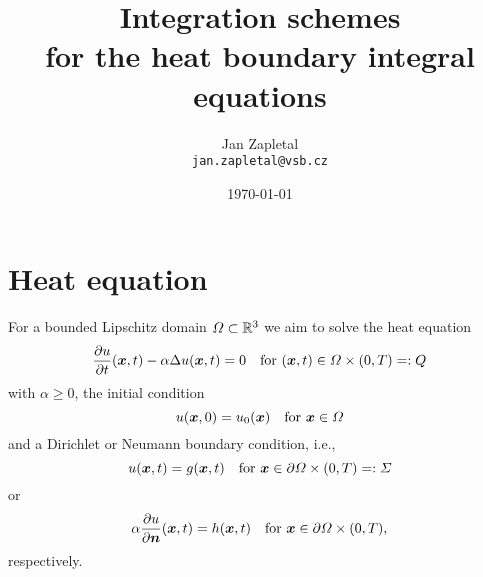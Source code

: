 \documentclass[a4paper,11pt]{article}
\title{\sffamily\bfseries Integration schemes \\ for the heat boundary integral equations}
\author{Jan Zapletal\\\texttt{jan.zapletal@vsb.cz}}
\date{\today}
\begin{document}

\maketitle
\thispagestyle{empty}
\vfill
\tableofcontents
\thispagestyle{empty}
\vfill
\newpage

\pagestyle{plain}
\setcounter{page}{1}

\section{Heat equation}

For a bounded Lipschitz domain $\Omega \subset {\mathbb{R}}^3$ we aim to solve the heat equation
\begin{equation}
  \label{eq:heat_eq}
  \frac{\partial u}{\partial t}(\vx,t) - \alpha \upDelta u(\vx,t) = 0 \quad\text{for } (\vx,t) \in \Omega \times (0,T) =: Q
\end{equation}
with $\alpha \geq 0$, the initial condition
\begin{equation*}
  u({{\bm{x}}},0) = u_0({{\bm{x}}}) \quad\text{for }{\ensuremath{{\bm{x}}}} \in \Omega
\end{equation*}
and a Dirichlet or Neumann boundary condition, i.e.,
\begin{equation*}
  u({{\bm{x}}},t) = g({{\bm{x}}},t) \quad\text{for }{\ensuremath{{\bm{x}}}} \in \partial\Omega \times (0,T) =: \Sigma
\end{equation*}
or
\begin{equation*}
  \alpha\frac{\partial u}{\partial {\ensuremath{{\bm{n}}}}}({{\bm{x}}},t) = h({{\bm{x}}},t) \quad\text{for }{\ensuremath{{\bm{x}}}} \in \partial\Omega \times (0,T),
\end{equation*}
respectively.
\end{document}

